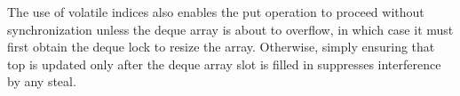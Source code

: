 The use of volatile indices also enables the put operation to proceed
without synchronization unless the deque array is about to overflow,
in which case it must first obtain the deque lock to resize the
array. Otherwise, simply ensuring that top is updated only after the
deque array slot is filled in suppresses interference by any steal.

    
      
    
    
    


